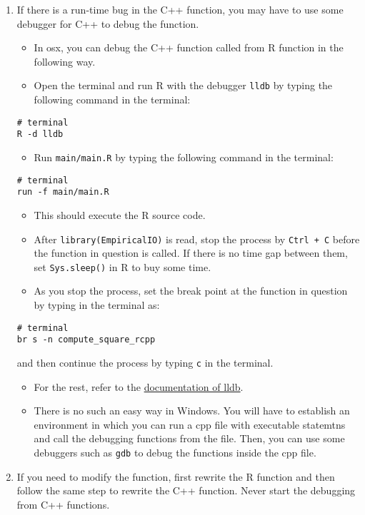 \documentclass[
]{book}
\providecommand{\tightlist}{%
  \setlength{\itemsep}{0pt}\setlength{\parskip}{0pt}}
\begin{document}
\begin{enumerate}
\def\labelenumi{\arabic{enumi}.}
\setcounter{enumi}{11}
\tightlist
\item
  If there is a run-time bug in the C++ function, you may have to use some debugger for C++ to debug the function.

  \begin{itemize}
  \tightlist
  \item
    In osx, you can debug the C++ function called from R function in the following way.
  \item
    Open the terminal and run R with the debugger \texttt{lldb} by typing the following command in the terminal:
  \end{itemize}

\begin{verbatim}
# terminal
R -d lldb
\end{verbatim}

  \begin{itemize}
  \tightlist
  \item
    Run \texttt{main/main.R} by typing the following command in the terminal:
  \end{itemize}

\begin{verbatim}
# terminal
run -f main/main.R
\end{verbatim}

  \begin{itemize}
  \tightlist
  \item
    This should execute the R source code.
  \item
    After \texttt{library(EmpiricalIO)} is read, stop the process by \texttt{Ctrl\ +\ C} before the function in question is called. If there is no time gap between them, set \texttt{Sys.sleep()} in R to buy some time.
  \item
    As you stop the process, set the break point at the function in question by typing in the terminal as:
  \end{itemize}

\begin{verbatim}
# terminal
br s -n compute_square_rcpp
\end{verbatim}

  and then continue the process by typing \texttt{c} in the terminal.

  \begin{itemize}
  \tightlist
  \item
    For the rest, refer to the \href{https://lldb.llvm.org/}{documentation of lldb}.
  \item
    There is no such an easy way in Windows. You will have to establish an environment in which you can run a cpp file with executable statemtns and call the debugging functions from the file. Then, you can use some debuggers such as \texttt{gdb} to debug the functions inside the cpp file.
  \end{itemize}
\item
  If you need to modify the function, first rewrite the R function and then follow the same step to rewrite the C++ function. Never start the debugging from C++ functions.
\end{enumerate}
\end{document}
